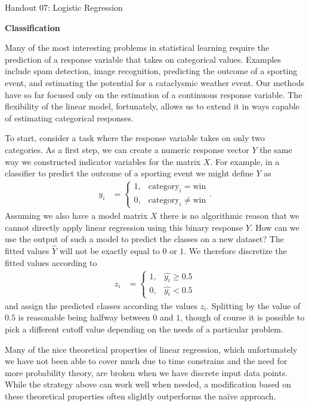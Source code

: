 \documentclass[12pt,hidelinks]{article}
\numberwithin{equation}{section}
\begin{document}
{\LARGE Handout 07: Logistic Regression}

\vspace*{18pt}

\textbf{Classification}

Many of the most interesting problems in statistical learning
require the prediction of a response variable that takes on
categorical values. Examples include spam detection, image
recognition, predicting the outcome of a sporting event, and
estimating the potential for a cataclysmic weather event. Our
methods have so far focused only on the estimation of a
continuous response variable. The flexibility of the linear
model, fortunately, allows us to extend it in ways
capable of estimating categorical responses.

To start, consider a task where the response variable takes
on only two categories. As a first step, we can create a numeric
response vector $Y$ the same way we constructed indicator
variables for the matrix $X$. For example, in a classifier to
predict the outcome of a sporting event we might define $Y$ as
\begin{align}
y_i &= \begin{cases} 1, & \text{category}_i =
   \text{win} \\ 0, & \text{category}_i \neq \text{win} \end{cases}.
\end{align}
Assuming we also have a model matrix $X$ there is no algorithmic
reason that we cannot directly apply linear regression using this
binary response $Y$.
How can we use the output of such a model to predict the classes
on a new dataset? The fitted values $\widehat{Y}$ will not be
exactly equal to $0$ or $1$. We therefore discretize the fitted
values according to
\begin{align}
z_i &= \begin{cases} 1, & \widehat{y_i} \geq 0.5 \\
 0, & \widehat{y_i} < 0.5 \end{cases} \label{disc_response}
\end{align}
and assign the predicted classes according the values $z_i$.
Splitting by the value of $0.5$ is reasonable being halfway
between $0$ and $1$, though of course it is possible to pick a
different cutoff value depending on the needs of a particular
problem.

Many of the nice theoretical properties of linear regression,
which unfortunately we have not been able to cover much due
to time constrains and the need for more probability theory,
are broken when we have discrete input data points. While the
strategy above can work well when needed, a modification based
on these theoretical properties often slightly outperforms the
naïve approach.
\end{document}

